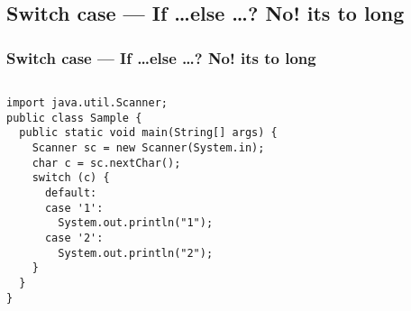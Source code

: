 \documentclass[en, 11pt, xcolor=dvipsnames]{beamer}
\begin{document}
\subsection{Switch case --- If \dots else \dots ? No! its to long}
\begin{frame}[fragile]
	\frametitle{Switch case --- If \dots else \dots ? No! its to long}



	\begin{columns}[c]
		\begin{column}{0.98\textwidth}

			\begin{lstlisting}[style=Java]
import java.util.Scanner;
public class Sample {
  public static void main(String[] args) {
    Scanner sc = new Scanner(System.in);
    char c = sc.nextChar();
    switch (c) {
      default:
      case '1':
        System.out.println("1");
      case '2':
        System.out.println("2");
    }
  }
}
\end{lstlisting}

		\end{column}
	\end{columns}

\end{frame}
\end{document}
